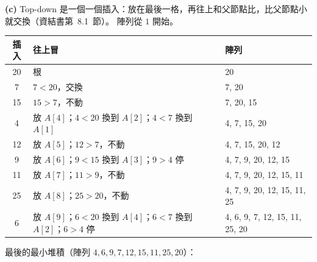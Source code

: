 \begin{pastsoln}
\textbf{(c)} Top-down 是一個一個插入：放在最後一格，再往上和父節點比，比父節點小就交換（資結書第~8.1~節）。
陣列從 $1$ 開始。
\begin{center}
\small
\begin{tabular}{cll}
\toprule
插入 & 往上冒 & 陣列 \\
\midrule
20 & 根 & 20 \\
7 & $7 < 20$，交換 & 7, 20 \\
15 & $15 > 7$，不動 & 7, 20, 15 \\
4 & 放 $A[4]$；$4 < 20$ 換到 $A[2]$；$4 < 7$ 換到 $A[1]$ & 4, 7, 15, 20 \\
12 & 放 $A[5]$；$12 > 7$，不動 & 4, 7, 15, 20, 12 \\
9 & 放 $A[6]$；$9 < 15$ 換到 $A[3]$；$9 > 4$ 停 & 4, 7, 9, 20, 12, 15 \\
11 & 放 $A[7]$；$11 > 9$，不動 & 4, 7, 9, 20, 12, 15, 11 \\
25 & 放 $A[8]$；$25 > 20$，不動 & 4, 7, 9, 20, 12, 15, 11, 25 \\
6 & 放 $A[9]$；$6 < 20$ 換到 $A[4]$；$6 < 7$ 換到 $A[2]$；$6 > 4$ 停 & 4, 6, 9, 7, 12, 15, 11, 25, 20 \\
\bottomrule
\end{tabular}
\end{center}
最後的最小堆積（陣列 $4, 6, 9, 7, 12, 15, 11, 25, 20$）：
\begin{center}
\end{center}


\end{pastsoln}
